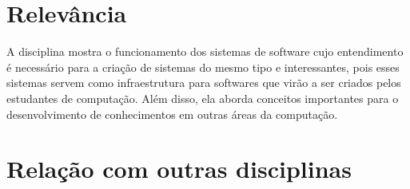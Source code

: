 \documentclass[10pt]{article}
\begin{document}
\section{Relevância}

	A disciplina mostra o funcionamento dos sistemas de software cujo entendimento é necessário para a criação de sistemas do mesmo tipo e interessantes, pois esses sistemas servem como infraestrutura para softwares que virão a ser criados pelos estudantes de computação. Além disso, ela aborda conceitos importantes para o desenvolvimento de conhecimentos em outras áreas da computação.

\section{Relação com outras disciplinas \cite{cinwiki-infrasoft}\cite{perfilcurricular}}
\end{document}
